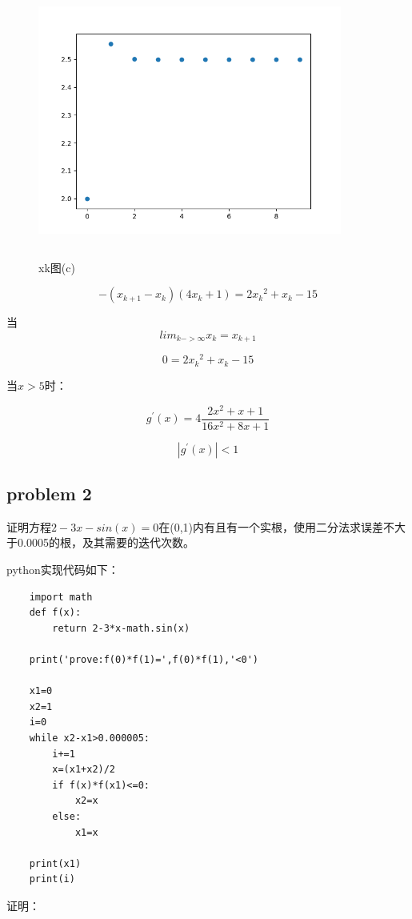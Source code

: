 \documentclass[UTF8]{ctexart}
\begin{document}
\begin{figure}[H]
 \centering
  \includegraphics[width=10cm,height=9cm]{2-1-3.png}
  \caption{xk图(c)}
\end{figure}

$$
-(x_{k+1}-x_{k})(4x_k+1)=2{x_k}^2+x_k-15
$$

当$$lim_{k->\infty}x_k=x_{k+1}$$


$$
0=2{x_k}^2+x_k-15
$$


当$x>5$时：

$$
g^{\prime} (x)=4\frac{2x^2+x+1}{16x^2+8x+1}
$$


$$
|g^{\prime} (x)|<1
$$





\subsection{problem 2}
证明方程$2-3x-sin(x)=0 $在(0,1)内有且有一个实根，使用二分法求误差不大于0.0005的根，及其需要的迭代次数。

python实现代码如下：

\begin{lstlisting}
	import math
	def f(x):
	    return 2-3*x-math.sin(x)
	
	print('prove:f(0)*f(1)=',f(0)*f(1),'<0')

	x1=0
	x2=1
	i=0
	while x2-x1>0.000005:
	    i+=1
	    x=(x1+x2)/2
	    if f(x)*f(x1)<=0:
	        x2=x
	    else:
	        x1=x

	print(x1)
	print(i)

\end{lstlisting}

证明：
\end{document}
